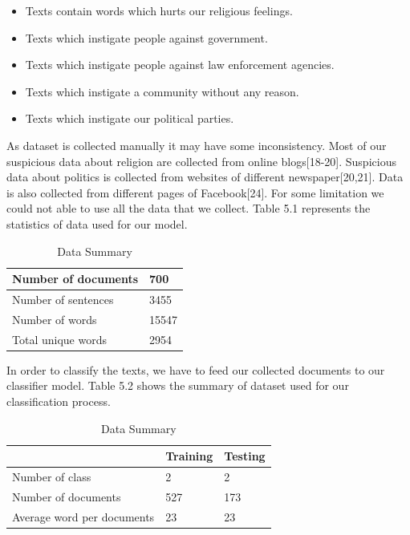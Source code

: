 \begin{itemize}
    \item Texts contain words which hurts our religious feelings.
    \item Texts which instigate people against government.
    \item Texts which instigate people against law enforcement agencies.
    \item Texts which instigate a community without any reason.
    \item Texts which instigate our political parties. 
    
\end{itemize}
As dataset is collected manually it may have some inconsistency.
\clearpage
\noindent
Most of our suspicious data about religion are collected from online blogs[18-20]. Suspicious data about politics is collected from websites of different newspaper[20,21]. Data is also collected from different pages of Facebook[24]. For some limitation we could not able to use all the data that we collect. Table 5.1 represents the statistics of data used for our model.
\renewcommand{\arraystretch}{1.3}
\begin{table}[h!]
\begin{center}
\caption{Data Summary}
\begin{tabular}{|m{6cm} | m{3cm}|}
\hline
     Number of documents & 700 \\
\hline
     Number of sentences & 3455\\
\hline 
     Number of words & 15547\\
\hline 
     Total unique words & 2954\\
\hline
\end{tabular}
\end{center}
\end{table}
\noindent
In order to classify the texts, we have to feed our collected documents to our classifier model. Table 5.2 shows the summary of dataset used for our classification process.
\renewcommand{\arraystretch}{1.3}
\begin{table}[h!]
\begin{center}
\caption{Data Summary}
\begin{tabular}{|m{6cm} | m{3cm}| m{3cm}|}
\hline
     & Training & Testing \\
\hline
     Number of class & 2 & 2\\
\hline 
     Number of documents & 527 & 173\\
\hline 
     Average word per documents & 23 & 23\\
\hline
\end{tabular}
\end{center}
\end{table}


